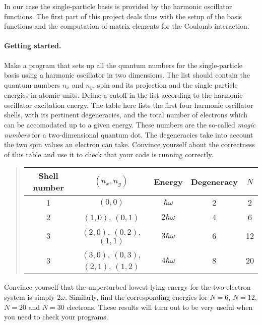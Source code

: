 \documentclass[%
oneside,                 %
final,                   %
10pt]{article}
\begin{document}
In our case the single-particle basis is provided by the harmonic oscillator functions. The first part of this project deals thus with the setup of the basis functions and the computation of matrix elements for the Coulomb interaction. 

\paragraph{Getting started.}
Make a program that sets up all the quantum numbers for the single-particle basis using a harmonic oscillator in two dimensions. The list should contain the quantum numbers $n_x$ and $n_y$, spin and its projection and the single particle energies in atomic units. Define a cutoff in the list according to the harmonic oscillator excitation energy. The table here lists the first four harmonic oscillator shells, with its pertinent degeneracies, and the total number of electrons which can be accomodated up to a given energy. These numbers are the so-called \emph{magic numbers} for a two-dimensional quantum dot. The degeneracies take into account the two spin values an electron can take. Convince yourself about the correctness of this table and use it to check that your code is running correctly.


\begin{quote}
\begin{tabular}{ccccc}
\hline
\multicolumn{1}{c}{ Shell number } & \multicolumn{1}{c}{ $(n_x, n_y)$ } & \multicolumn{1}{c}{ Energy } & \multicolumn{1}{c}{ Degeneracy } & \multicolumn{1}{c}{ $N$ } \\
\hline
1            & $(0,0)$                            & $\hbar\omega$  & 2          & 2   \\
\hline
2            & $(1,0)$, $(0,1)$                   & $2\hbar\omega$ & 4          & 6   \\
\hline
3            & $(2,0)$, $(0,2)$, $(1,1)$          & $3\hbar\omega$ & 6          & 12  \\
\hline
3            & $(3,0)$, $(0,3)$, $(2,1)$, $(1,2)$ & $4\hbar\omega$ & 8          & 20  \\
\hline
\end{tabular}
\end{quote}

\noindent
Convince yourself that the unperturbed lowest-lying energy for the two-electron system  is simply $2\omega$. Similarly, find the corresponding energies for $N=6$, $N=12$, $N=20$ and $N=30$ electrons.
These results will turn out to be very useful when you need to check your programs.
\end{document}

